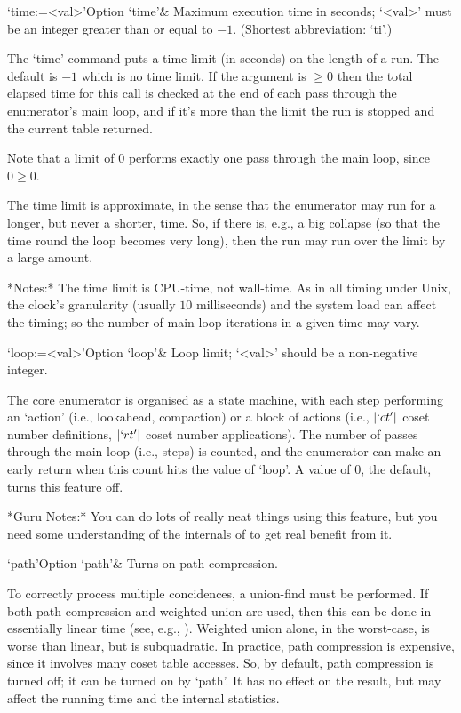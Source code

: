 \>`time:=<val>'{Option `time'}&
Maximum execution time in seconds; `<val>' must be an integer  greater
than or equal to $-1$. (Shortest abbreviation: `ti'.)

The `time' command  puts a time limit (in seconds) on  the length of a
run. The default is $-1$  which is no  time limit. If the  argument is
$\ge0$ then the total elapsed time for this call is checked at the end
of each pass through the enumerator's main loop, and if it's more than
the limit the run is stopped and the current table returned.

Note that a limit of $0$ performs exactly one pass  through  the  main
loop, since $0 \ge 0$.

%
%
%

The time  limit is approximate, in  the sense that  the enumerator may
run for a longer, but never a shorter, time.  So, if there is, e.g., a
big collapse (so that the time round the loop becomes very long), then
the run may run over the limit by a large amount.

*Notes:*
The time limit is CPU-time, not wall-time.  As  in  all  timing  under
Unix, the clock's granularity  (usually  $10$  milliseconds)  and  the
system load can  affect  the  timing;  so  the  number  of  main  loop
iterations in a given time may vary.

\>`loop:=<val>'{Option `loop'}&
Loop limit; `<val>' should be a non-negative integer.

The core enumerator is organised as a state machine,  with  each  step
performing an \lq{}action' (i.e., lookahead, compaction) or a block of
actions (i.e.,  $|`ct'|$  coset  number  definitions,  $|`rt'|$  coset
number applications). The number  of  passes  through  the  main  loop
(i.e., steps) is counted, and the enumerator can make an early  return
when this count hits the value of `loop'. A value of $0$, the default,
turns this feature off.

*Guru Notes:*
You can do lots of really neat things using this feature, but you need
some understanding of the internals of {\ACE} to get real benefit from
it.

\>`path'{Option `path'}&
Turns on path compression.

To correctly  process  multiple  concidences,  a  union-find  must  be
performed. If both path compression and weighted union are used,  then
this can be done in essentially linear time (see, e.g., \cite{CLR90}).
Weighted union alone, in the worst-case, is worse than linear, but  is
subquadratic. In practice, path compression  is  expensive,  since  it
involves many coset table accesses. So, by default,  path  compression
is turned off; it can be turned on by `path'. It has no effect on  the
result, but may affect the running time and the internal statistics.

